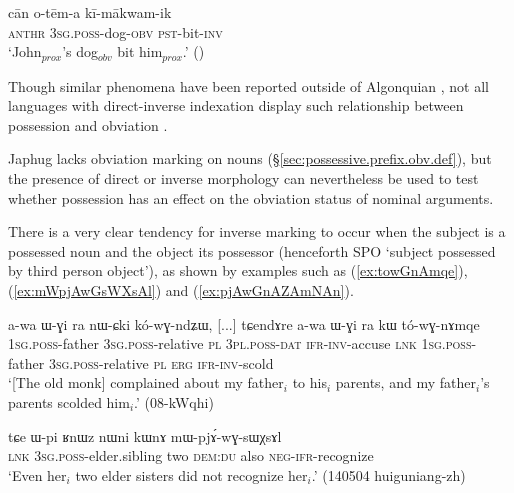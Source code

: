 \begin{exe}
\ex \label{ex:cree.kiimaakwamik}
 \gll cān o-tēm-a kī-mākwam-ik  \\
  \textsc{anthr} \textsc{3sg}.\textsc{poss}-dog-\textsc{obv} \textsc{pst}-bit-\textsc{inv} \\
 \glt `John$_{prox}$'s dog$_{obv}$ bit him$_{prox}$.' (\citealt[25]{wolfart73})
\end{exe}

Though similar phenomena have been reported outside of Algonquian \citep{aissen97obviation}, not all languages with direct-inverse indexation display such relationship between possession and obviation \citep{haude16symmetrical}.
 
Japhug lacks obviation marking on nouns (§\ref{sec:possessive.prefix.obv.def}), but the presence of direct or inverse morphology can nevertheless be used to test whether possession has an effect on the obviation status of nominal arguments.

There is a very clear tendency for inverse marking to occur when the subject is a possessed noun and the object its possessor (henceforth  SPO `subject possessed by third person object'), as shown by examples such as (\ref{ex:towGnAmqe}), (\ref{ex:mWpjAwGsWXsAl}) and (\ref{ex:pjAwGnAZAmNAn}).

\begin{exe}
\ex \label{ex:towGnAmqe}
 \gll   a-wa ɯ-ɣi ra nɯ-ɕki kó-wɣ-ndʑɯ, [...] tɕendɤre  a-wa ɯ-ɣi ra kɯ tó-wɣ-nɤmqe \\
  \textsc{1sg}.\textsc{poss}-father \textsc{3sg}.\textsc{poss}-relative  \textsc{pl} \textsc{3pl}.\textsc{poss}-\textsc{dat} \textsc{ifr}-\textsc{inv}-accuse  {  } \textsc{lnk}  \textsc{1sg}.\textsc{poss}-father \textsc{3sg}.\textsc{poss}-relative \textsc{pl} \textsc{erg} \textsc{ifr}-\textsc{inv}-scold \\
 \glt `[The old monk] complained about my father$_i$ to his$_i$ parents, and my father$_i$'s parents scolded him$_i$.' (08-kWqhi)
\end{exe}  
  
\begin{exe}
\ex \label{ex:mWpjAwGsWXsAl}
 \gll  tɕe ɯ-pi ʁnɯz nɯni kɯnɤ mɯ-pjɤ́-wɣ-sɯχsɤl \\
 \textsc{lnk} \textsc{3sg}.\textsc{poss}-elder.sibling two \textsc{dem}:\textsc{du} also \textsc{neg}-\textsc{ifr}-recognize \\
 \glt `Even her$_i$ two elder sisters did not recognize her$_i$.' (140504 huiguniang-zh)
\end{exe}
 

